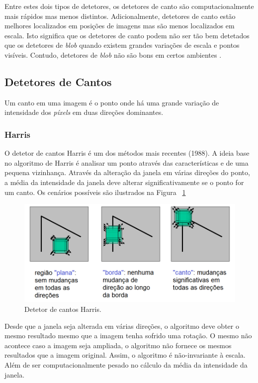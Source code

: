 Entre estes dois tipos de detetores, os detetores de canto são computacionalmente mais rápidos mas menos distintos. Adicionalmente, detetores de canto estão melhores localizados em posições de imagens mas são menos localizados em escala. Isto significa que os detetores de canto podem não ser tão bem detetados que os detetores de \textit{blob} quando existem grandes variações de escala e pontos visíveis. Contudo, detetores de \textit{blob} não são bons em certos ambientes \cite{Fraundorfer2012}.

\subsection{Detetores de Cantos}

Um canto em uma imagem é o ponto onde há uma grande variação de intensidade dos \textit{píxels} em duas direções dominantes. 

\subsubsection{Harris}

O detetor de cantos Harris é um dos métodos mais recentes (1988). A ideia base no algoritmo de Harris é analisar um ponto através das características e de uma pequena vizinhança. Através da alteração da janela em várias direções do ponto, a média da intensidade da janela deve alterar significativamente se o ponto for um canto. Os cenários possíveis são ilustrados na Figura ~\ref{fig:harriscornerdetection}

\begin{figure}[h!]
	\centering
	\includegraphics[width=0.7\linewidth]{figures/HarrisCornerDetection}
	\caption{Detetor de cantos Harris. \cite{VisualOdometryRodasVehicles}}
	\label{fig:harriscornerdetection}
\end{figure}

Desde que a janela seja alterada em várias direções, o algoritmo deve obter o mesmo resultado mesmo que a imagem tenha sofrido uma rotação. O mesmo não acontece caso a imagem seja ampliada, o algoritmo não fornece os mesmos resultados que a imagem original. Assim, o algoritmo é não-invariante à escala. Além de ser computacionalmente pesado no cálculo da média da intensidade da janela. %


